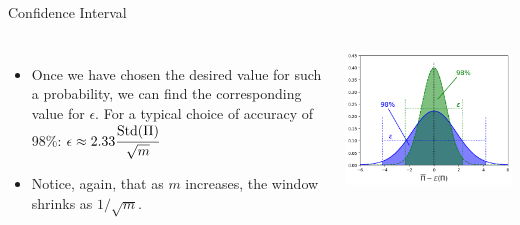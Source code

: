 \documentclass{beamer}
\begin{document}

\begin{frame}{Confidence Interval}
  \begin{columns}
    \begin{itemize}
    \item Once we have chosen the desired value for such a probability, we can find the corresponding value for $\epsilon$. For a typical choice of accuracy of 98\%: $\epsilon \approx 2.33 \cfrac{\text{Std}(\Pi)}{\sqrt{m}}$
    \item Notice, again, that as $m$ increases, the window shrinks as $1/\sqrt{m}$.
    \end{itemize}
    \includegraphics[width=0.9\linewidth]{images/confidence_interval}
  \end{columns}
\end{frame}
\end{document}
